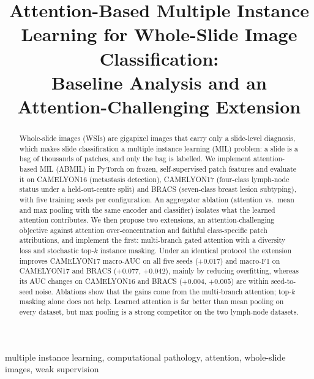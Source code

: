 \documentclass[conference]{IEEEtran}
\begin{document}
\title{Attention-Based Multiple Instance Learning for Whole-Slide Image Classification:\\
Baseline Analysis and an Attention-Challenging Extension}

\author{
}

\maketitle

\begin{abstract}
Whole-slide images (WSIs) are gigapixel images that carry only a slide-level diagnosis, which makes slide classification a multiple instance learning (MIL) problem: a slide is a bag of thousands of patches, and only the bag is labelled.
We implement attention-based MIL (ABMIL) in PyTorch on frozen, self-supervised patch features and evaluate it on CAMELYON16 (metastasis detection), CAMELYON17 (four-class lymph-node status under a held-out-centre split) and BRACS (seven-class breast lesion subtyping), with five training seeds per configuration.
An aggregator ablation (attention vs.\ mean and max pooling with the same encoder and classifier) isolates what the learned attention contributes.
We then propose two extensions, an attention-challenging objective against attention over-concentration and faithful class-specific patch attributions, and implement the first: multi-branch gated attention with a diversity loss and stochastic top-$k$ instance masking.
Under an identical protocol the extension improves CAMELYON17 macro-AUC on all five seeds ($+0.017$) and macro-F1 on CAMELYON17 and BRACS ($+0.077$, $+0.042$), mainly by reducing overfitting, whereas its AUC changes on CAMELYON16 and BRACS ($+0.004$, $+0.005$) are within seed-to-seed noise. Ablations show that the gains come from the multi-branch attention; top-$k$ masking alone does not help. Learned attention is far better than mean pooling on every dataset, but max pooling is a strong competitor on the two lymph-node datasets.
\end{abstract}

\begin{IEEEkeywords}
multiple instance learning, computational pathology, attention, whole-slide images, weak supervision
\end{IEEEkeywords}
\end{document}
